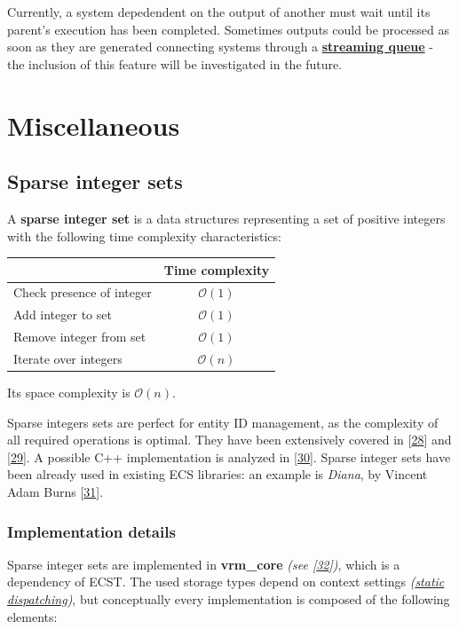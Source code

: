 \documentclass[twoside, 12pt, a4paper, openany]{book}
\begin{document}
Currently, a system depedendent on the output of another must wait until
its parent's execution has been completed. Sometimes outputs could be
processed as soon as they are generated connecting systems through a
\protect\hyperlink{sys_streamqueue}{\textbf{streaming queue}} - the
inclusion of this feature will be investigated in the future.

\chapter{Miscellaneous}\label{miscellaneous}

\hypertarget{appendix_sparse_integer_sets}{\section{Sparse integer
sets}\label{appendix_sparse_integer_sets}}

A \textbf{sparse integer set} is a data structures representing a set of
positive integers with the following time complexity characteristics:

\begin{longtable}[]{@{}lc@{}}
\toprule
& Time complexity\tabularnewline
\midrule
\endhead
Check presence of integer & \(\mathcal{O}(1)\)\tabularnewline
Add integer to set & \(\mathcal{O}(1)\)\tabularnewline
Remove integer from set & \(\mathcal{O}(1)\)\tabularnewline
Iterate over integers & \(\mathcal{O}(n)\)\tabularnewline
\bottomrule
\end{longtable}

Its space complexity is \(\mathcal{O}(n)\).

Sparse integers sets are perfect for entity ID management, as the
complexity of all required operations is optimal. They have been
extensively covered in {[}\protect\hyperlink{ref-sparsesets132}{28}{]}
and {[}\protect\hyperlink{ref-sparsesets_praxis}{29}{]}. A possible C++
implementation is analyzed in
{[}\protect\hyperlink{ref-sparsesets_cpp}{30}{]}. Sparse integer sets
have been already used in existing ECS libraries: an example is
\emph{Diana}, by Vincent Adam Burns
{[}\protect\hyperlink{ref-github_diana}{31}{]}.

\subsection{Implementation details}\label{implementation-details-4}

Sparse integer sets are implemented in \textbf{vrm\_core} \emph{(see
{[}\protect\hyperlink{ref-github_vrmcore}{32}{]})}, which is a
dependency of ECST. The used storage types depend on context settings
\emph{(\protect\hyperlink{appendix_static_dispatching}{static
dispatching})}, but conceptually every implementation is composed of the
following elements:
\end{document}

